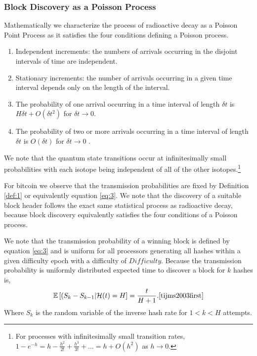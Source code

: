 \documentclass[runningheads]{llncs}
\begin{document}
\subsubsection{Block Discovery as a Poisson Process}
Mathematically we characterize the process of radioactive decay as a Poisson Point Process as it satisfies the four conditions defining a Poisson process.
\begin{enumerate}
    \item Independent increments: the numbers of arrivals occurring in the disjoint intervals of time are independent.
    \item Stationary increments: the number of arrivals occurring in a given time interval depends only on the length of the interval.
    \item The probability of one arrival occurring in a time interval of length $\delta t$ is $H \delta t + O(\delta t^2)$ for $\delta t \rightarrow 0$.
    \item The probability of two or more arrivals occurring in a time interval of length $\delta t$ is $O(\delta t)$ for $\delta t \rightarrow 0$ \cite{tijms2003first}.
\end{enumerate}
We note that the quantum state transitions occur at infinitesimally small probabilities with each isotope being independent of all of the other isotopes.\footnote{
    For processes with infinitesimally small transition rates, $1 - e^{-h} = h - \frac{h^2}{2!} + \frac{h^3}{3!} + \ldots = h + O(h^2)$ as $h \rightarrow 0$\cite{tijms2003first}.}

For bitcoin we observe that the transmission probabilities are fixed by Definition \ref{def:1} or equivalently equation \ref{eq:3}.
We note that the discovery of a suitable block header follows the exact same statistical process as radioactive decay, because block discovery equivalently satisfies the four conditions of a Poisson process.

We note that the transmission probability of a winning block is defined by equation \ref{eq:3} and is uniform for all processors generating all hashes within a given difficulty epoch with a difficulty of $Difficulty$.
Because the transmission probability is uniformly distributed expected time to discover a block for $k$ hashes is, 
\begin{equation}
    \mathbb{E}\left[(S_k - S_{k - 1}| \mathcal{H}(t) = H\right] = \frac{t}{H + 1}.\mbox{\cite{tijms2003first}}
\end{equation}
Where $S_k$ is the random variable of the inverse hash rate for $1 < k < H$ attempts.
\end{document}
